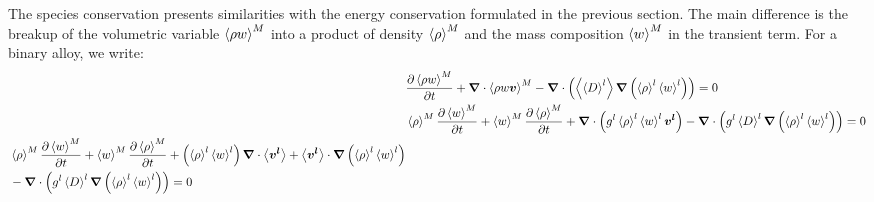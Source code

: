 
The species conservation presents similarities with the energy conservation formulated in the previous section. 
The main difference is the breakup of the volumetric variable $\left \langle \rho w \right \rangle^M$ into a product of 
density  $\left \langle \rho \right \rangle^M$ and the mass composition $\left \langle w \right \rangle^M$ in the transient term.
For a binary alloy, we write:
\begin{subequations}
\begin{align}
 & \tempup{\avg{\rho w}^M} + \nabvec \cdot \avg{\rho w \vec{v}}^M - \nabvec  \cdot \brac{\avg{\Dl} \nabvec \brac{\rhol \wl} } = 0 \\
 & \avg{\rho}^M \tempup{\avg{w}^M} + \avg{w}^M \tempup{\avg{\rho}^M} 
	+ \nabvec \cdot \brac{\gl \rhol \wl \vl} 
	- \nabvec \cdot \brac{\gl \Dl \nabvec \brac{\rhol \wl} } = 0 \\
 \label{eq:species_1}
  \begin{split}
	& \avg{\rho}^M \tempup{\avg{w}^M} + \avg{w}^M \tempup{\avg{\rho}^M} 
	+ \brac{\rhol \wl} \nabvec \cdot \vit + \vit \cdot \nabvec \brac{\rhol \wl} \\
	& - \nabvec \cdot \brac{\gl \Dl \nabvec \brac{\rhol \wl} } = 0 
  \end{split}
%
\end{align}
\end{subequations}

